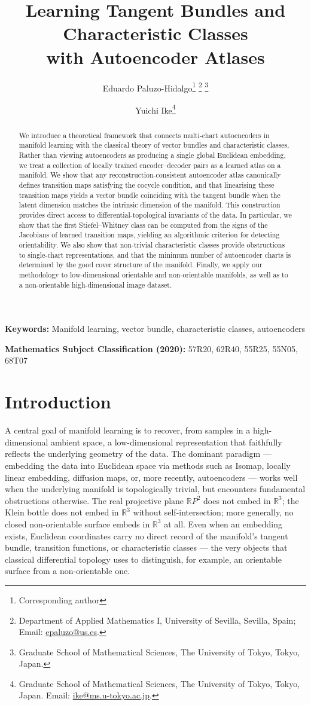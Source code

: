 \documentclass[11pt]{article}
\title{Learning Tangent Bundles and Characteristic Classes \\ with Autoencoder Atlases}
\author{
Eduardo Paluzo-Hidalgo\thanks{Corresponding author}\,\,\thanks{Department of Applied Mathematics I, University of Sevilla, Sevilla, Spain; Email: \href{mailto:epaluzo@us.es}{epaluzo@us.es}.}\,\,\thanks{Graduate School of Mathematical Sciences, The University of Tokyo, Tokyo, Japan.}
\and
Yuichi Ike\thanks{Graduate School of Mathematical Sciences, The University of Tokyo, Tokyo, Japan. Email: \href{mailto:ike@ms.u-tokyo.ac.jp}{ike@ms.u-tokyo.ac.jp}.}
}
\date{}
\newcommand{\R}{\mathbb{R}}
\theoremstyle{plain}
\theoremstyle{definition}
\theoremstyle{remark}
\begin{document}
\selectfont
\maketitle

\begin{abstract}
We introduce a theoretical framework that connects multi-chart autoencoders in manifold learning with the classical theory of vector bundles and characteristic classes. Rather than viewing autoencoders as producing a single global Euclidean embedding, we treat a collection of locally trained encoder--decoder pairs as a learned atlas on a manifold. We show that any reconstruction-consistent autoencoder atlas canonically defines transition maps satisfying the cocycle condition, and that linearising these transition maps yields a vector bundle coinciding with the tangent bundle when the latent dimension matches the intrinsic dimension of the manifold. This construction provides direct access to differential-topological invariants of the data. In particular, we show that the first Stiefel--Whitney class can be computed from the signs of the Jacobians of learned transition maps, yielding an algorithmic criterion for detecting orientability. We also show that non-trivial characteristic classes provide obstructions to single-chart representations, and that the minimum number of autoencoder charts is determined by the good cover structure of the manifold. Finally, we apply our methodology to low-dimensional orientable and non-orientable manifolds, as well as to a non-orientable high-dimensional image dataset.
\end{abstract}

\medskip
\noindent\textbf{Keywords:} Manifold learning, vector bundle, characteristic classes, autoencoders

\medskip
\noindent\textbf{Mathematics Subject Classification (2020):} 57R20, 62R40, 55R25, 55N05, 68T07

\section{Introduction}\label{sec:introduction}

A central goal of manifold learning is to recover, from samples in a high-dimensional ambient space, a low-dimensional representation that faithfully reflects the underlying geometry of the data. The dominant paradigm — embedding the data into Euclidean space via methods such as Isomap, locally linear embedding, diffusion maps, or, more recently, autoencoders — works well when the underlying manifold is topologically trivial, but encounters fundamental obstructions otherwise. The real projective plane $\mathbb{R}P^2$ does not embed in $\R^3$; the Klein bottle does not embed in $\R^3$ without self-intersection; more generally, no closed non-orientable surface embeds in $\R^3$ at all. Even when an embedding exists, Euclidean coordinates carry no direct record of the manifold's tangent bundle, transition functions, or characteristic classes — the very objects that classical differential topology uses to distinguish, for example, an orientable surface from a non-orientable one.
\end{document}
